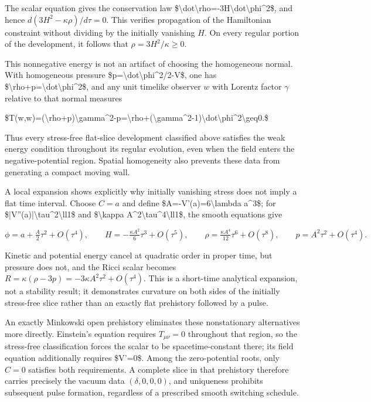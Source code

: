 \documentclass[11pt]{article}
\begin{document}
The scalar equation gives the conservation law \$\textbackslash{}dot\textbackslash{}rho=-3H\textbackslash{}dot\textbackslash{}phi\textasciicircum{}2\$, and hence $d(3H^2-\kappa\rho)/d\tau=0$. This verifies propagation of the Hamiltonian constraint without dividing by the initially vanishing $H$. On every regular portion of the development, it follows that $\rho=3H^2/\kappa\geq0$.

This nonnegative energy is not an artifact of choosing the homogeneous normal. With homogeneous pressure \$p=\textbackslash{}dot\textbackslash{}phi\textasciicircum{}2/2-V\$, one has \$\textbackslash{}rho+p=\textbackslash{}dot\textbackslash{}phi\textasciicircum{}2\$, and any unit timelike observer $w$ with Lorentz factor $\gamma$ relative to that normal measures

\$T(w,w)=(\textbackslash{}rho+p)\textbackslash{}gamma\textasciicircum{}2-p=\textbackslash{}rho+(\textbackslash{}gamma\textasciicircum{}2-1)\textbackslash{}dot\textbackslash{}phi\textasciicircum{}2\textbackslash{}geq0.\$

Thus every stress-free flat-slice development classified above satisfies the weak energy condition throughout its regular evolution, even when the field enters the negative-potential region. Spatial homogeneity also prevents these data from generating a compact moving wall.

A local expansion shows explicitly why initially vanishing stress does not imply a flat time interval. Choose $C=a$ and define \$A=-V'(a)=6\textbackslash{}lambda a\textasciicircum{}3\$; for \$|V''(a)|\textbackslash{}tau\textasciicircum{}2\textbackslash{}ll1\$ and \$\textbackslash{}kappa A\textasciicircum{}2\textbackslash{}tau\textasciicircum{}4\textbackslash{}ll1\$, the smooth equations give

$\phi=a+\frac{A}{2}\tau^2+O(\tau^4),\qquad H=-\frac{\kappa A^2}{6}\tau^3+O(\tau^5),\qquad \rho=\frac{\kappa A^4}{12}\tau^6+O(\tau^8),\qquad p=A^2\tau^2+O(\tau^4).$

Kinetic and potential energy cancel at quadratic order in proper time, but pressure does not, and the Ricci scalar becomes $R=\kappa(\rho-3p)=-3\kappa A^2\tau^2+O(\tau^4)$. This is a short-time analytical expansion, not a stability result; it demonstrates curvature on both sides of the initially stress-free slice rather than an exactly flat prehistory followed by a pulse.

An exactly Minkowski open prehistory eliminates these nonstationary alternatives more directly. Einstein's equation requires $T_{\mu\nu}=0$ throughout that region, so the stress-free classification forces the scalar to be spacetime-constant there; its field equation additionally requires \$V'=0\$. Among the zero-potential roots, only $C=0$ satisfies both requirements. A complete slice in that prehistory therefore carries precisely the vacuum data $(\delta,0,0,0)$, and uniqueness prohibits subsequent pulse formation, regardless of a prescribed smooth switching schedule.
\end{document}
